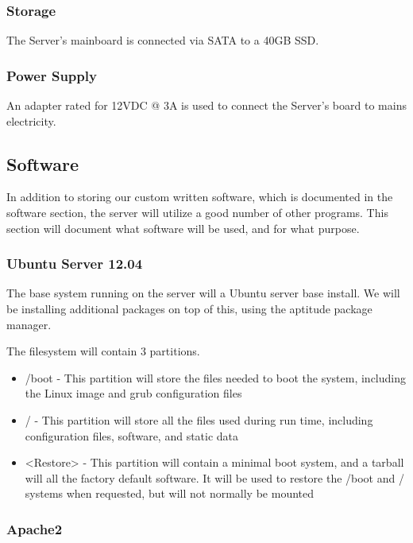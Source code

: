 \subsubsection{Storage}
The Server's mainboard is connected via SATA to a 40GB SSD.

\subsubsection{Power Supply}
An adapter rated for 12VDC @ 3A is used to connect the Server's board to mains electricity.

\subsection{Software}

In addition to storing our custom written software, which is documented in the software section, the server will utilize a good number of other programs. 
This section will document what software will be used, and for what purpose.

\subsubsection{Ubuntu Server 12.04}

The base system running on the server will a Ubuntu server base install. 
We will be installing additional packages on top of this, using the aptitude package manager.

The filesystem will contain 3 partitions.

\begin{itemize}
 \item /boot - This partition will store the files needed to boot the system, including the Linux image and grub configuration files
 \item / - This partition will store all the files used during run time, including configuration files, software, and static data
 \item <Restore> - This partition will contain a minimal boot system, and a tarball will all the factory default software. It will be used to restore the /boot and / systems when requested, but will not normally be mounted
\end{itemize}

\subsubsection{Apache2}

